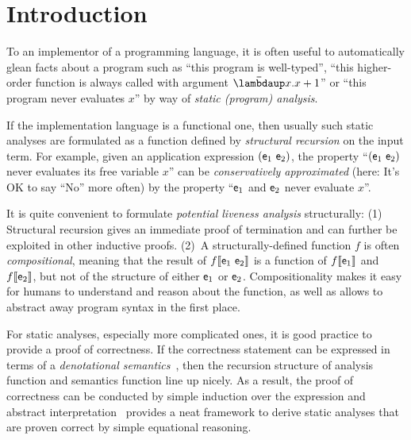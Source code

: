 \section{Introduction}
\label{sec:introduction}

To an implementor of a programming language, it is often useful to automatically
glean facts about a program such as ``this program is well-typed'', ``this
higher-order function is always called with argument $\Lam{x}{x+1}$'' or ``this
program never evaluates $x$'' by way of \emph{static (program) analysis}.

If the implementation language is a functional one, then usually such static
analyses are formulated as a function defined by \emph{structural recursion} on
the input term.
For example, given an application expression $(\mathsf{e}_1~\mathsf{e}_2)$,
the property ``$(\mathsf{e}_1~\mathsf{e}_2)$ never evaluates its free variable $x$'' can be
\emph{conservatively approximated} (here: It's OK to say ``No'' more often) by
the property ``$\mathsf{e}_1$ and $\mathsf{e}_2$ never evaluate $x$''.

It is quite convenient to formulate \emph{potential liveness analysis}
structurally:
(1) Structural recursion gives an immediate proof of termination and can
    further be exploited in other inductive proofs.
(2)~A structurally-defined function $f$ is often \emph{compositional}, meaning that
    the result of $f\llbracket {\mathsf{e}_1~\mathsf{e}_2} \rrbracket$ is a function of $f\llbracket {\mathsf{e}_1} \rrbracket$ and
    $f\llbracket {\mathsf{e}_2} \rrbracket$, but not of the structure of either $\mathsf{e}_1$ or $\mathsf{e}_2$.
    Compositionality makes it easy for humans to understand and reason about the
    function, as well as allows to abstract away program syntax in the first
    place.

For static analyses, especially more complicated ones, it is good practice to
provide a proof of correctness.
If the correctness statement can be expressed in terms of a \emph{denotational
semantics}~\citep{ScottStrachey:71}, then the recursion structure of analysis
function and semantics function line up nicely.
As a result, the proof of correctness can be conducted by simple induction
over the expression and abstract interpretation~\citep{Cousot:21} provides a
neat framework to derive static analyses that are proven correct by simple
equational reasoning.

